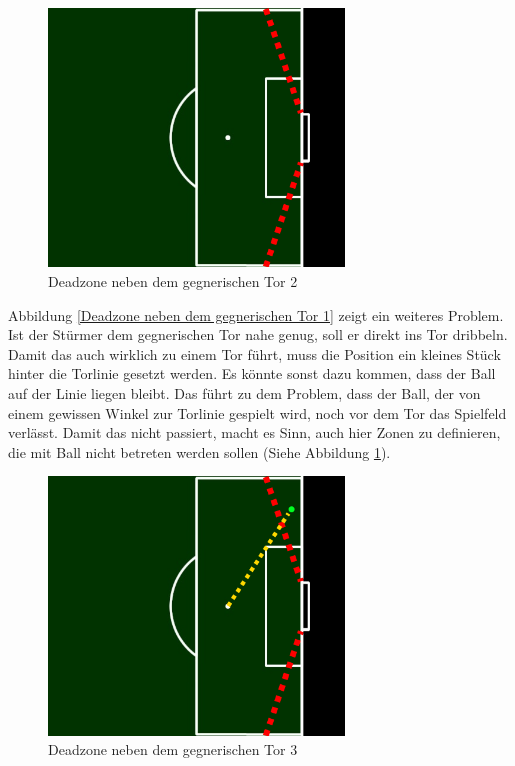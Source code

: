 \documentclass[fontsize=12pt,a4paper,final]{scrartcl}[2003/01/01]
\begin{document}
\begin{figure}[H]
	\centering
	\includegraphics[width=0.7\textwidth]{Grafiken/KI/deadzone_3}
	\caption{Deadzone neben dem gegnerischen Tor 2}
	\label{Deadzone neben dem gegnerischen Tor 2}
\end{figure}

Abbildung \ref{Deadzone neben dem gegnerischen Tor 1} zeigt ein weiteres Problem. Ist der Stürmer dem gegnerischen Tor nahe genug, soll er direkt ins Tor dribbeln. Damit das auch wirklich zu einem Tor führt, muss die Position ein kleines Stück hinter die Torlinie gesetzt werden. Es könnte sonst dazu kommen, dass der Ball auf der Linie liegen bleibt. Das führt zu dem Problem, dass der Ball, der von einem gewissen Winkel zur Torlinie gespielt wird, noch vor dem Tor das Spielfeld verlässt. Damit das nicht passiert, macht es Sinn, auch hier Zonen zu definieren, die mit Ball nicht betreten werden sollen (Siehe Abbildung \ref{Deadzone neben dem gegnerischen Tor 2}).

\begin{figure}[H]
	\centering
	\includegraphics[width=0.7\textwidth]{Grafiken/KI/deadzone_6}
	\caption{Deadzone neben dem gegnerischen Tor 3}
	\label{Deadzone neben dem gegnerischen Tor 3}
\end{figure}
\end{document}
